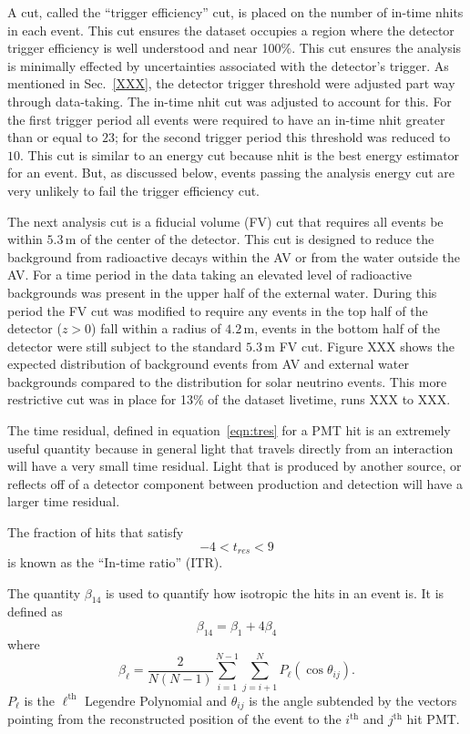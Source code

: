 A cut, called the ``trigger efficiency'' cut,  is placed on the number of
in-time nhits in each event.
This cut ensures the dataset occupies a region where the detector trigger
efficiency is well understood and near 100\%.
This cut ensures the analysis is minimally effected by uncertainties
associated with the detector's trigger.
As mentioned in Sec.~\ref{XXX}, the detector trigger threshold were adjusted
part way through data-taking. The in-time nhit cut was adjusted to
account for this.
For the first trigger period all events were required to have an in-time
nhit greater than or equal to $23$; for the second trigger period this
threshold was reduced to $10$.
This cut is similar to an energy cut because nhit is the best energy estimator
for an event. But, as discussed below, events passing the analysis energy cut
are very unlikely to fail the trigger efficiency cut.

The next analysis cut is a fiducial volume (FV) cut that requires all events
be within $5.3$\,m of the center of the detector.
This cut is designed to reduce the background from radioactive decays within
the AV or from the water outside the AV\@.
For a time period in the data taking an elevated level of radioactive
backgrounds was present in the upper half of the external water.
During this period the FV cut was modified to require any events in the
top half of the detector ($z > 0$) fall within a radius of $4.2$\,m,
events in the bottom half of the detector were still subject to the standard
$5.3$\,m FV cut.
Figure {XXX} shows the expected distribution of background events from
AV and external water backgrounds compared to the distribution for solar neutrino
events. This more restrictive cut was in place for 13\% of the dataset livetime,
runs XXX to XXX\@.

The time residual, defined in equation~\ref{eqn:tres} for a PMT hit is an extremely
useful quantity because in general light that travels directly from an
interaction will have a very small time residual.
Light that is produced by another source, or reflects off of a detector component
between production and detection will have a larger time residual.

The fraction of hits that satisfy
\begin{equation}
    -4 < t_{res} < 9 %
\end{equation}
is known as the ``In-time ratio'' (ITR).

The quantity $\beta_{14}$ is used to quantify how isotropic the hits
in an event is. It is defined as
\begin{equation}
    \beta_{14} = \beta_{1} + 4\beta_{4}
\end{equation}
where
\begin{equation}
\beta_{\ell} = \frac{2}{N(N-1)}\sum_{i=1}^{N-1}\sum_{j=i+1}^{N}P_{\ell}(\cos\theta_{ij})\text{.}
\end{equation}
$P_{\ell}$ is the $\ell^{\text{th}}$ Legendre Polynomial and
$\theta_{ij}$ is the angle subtended by the vectors pointing
from the reconstructed position of the event to the $i^{\text{th}}$ and
$j^{\text{th}}$ hit PMT.


